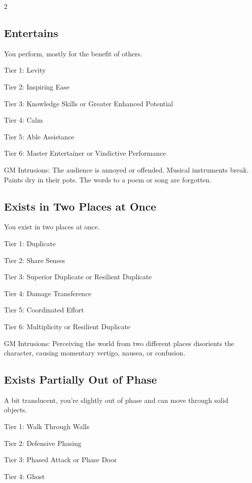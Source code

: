 \begin{multicols}{2}
\subsection{Entertains}

You perform, mostly for the benefit of others.

Tier 1: Levity

Tier 2: Inspiring Ease

Tier 3: Knowledge Skills or Greater Enhanced Potential

Tier 4: Calm

Tier 5: Able Assistance

Tier 6: Master Entertainer or Vindictive Performance

GM Intrusions: The audience is annoyed or offended. Musical instruments break. Paints dry in their pots. The words to a poem or song are forgotten.

\subsection{Exists in Two Places at Once}

You exist in two places at once.

Tier 1: Duplicate

Tier 2: Share Senses

Tier 3: Superior Duplicate or Resilient Duplicate

Tier 4: Damage Transference

Tier 5: Coordinated Effort

Tier 6: Multiplicity or Resilient Duplicate

GM Intrusions: Perceiving the world from two different places disorients the character, causing momentary vertigo, nausea, or confusion.

\subsection{Exists Partially Out of Phase}

A bit translucent, you’re slightly out of phase and can move through solid objects.

Tier 1: Walk Through Walls

Tier 2: Defensive Phasing

Tier 3: Phased Attack or Phase Door

Tier 4: Ghost


\end{multicols}

